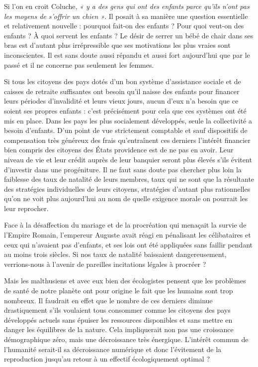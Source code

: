 Si l'on en croit Coluche, \emph{« y a des gens qui ont des enfants parce qu'ils n'ont pas les moyens de s'offrir un chien »}. Il posait à sa manière une question essentielle et relativement nouvelle : pourquoi fait-on des enfants ? Pour quoi veut-on des enfants ? À quoi servent les enfants ?
Le désir de serrer un bébé de chair dans ses bras est d'autant plus irrépressible que ses motivations les plus vraies sont inconscientes. Il est sans doute aussi répandu et aussi fort aujourd'hui que par le passé et il ne concerne pas seulement les femmes. 



 Si tous les citoyens des pays dotés d'un bon système d'assistance sociale et de caisses de retraite suffisantes ont besoin qu'il naisse des enfants pour financer leurs périodes d'invalidité et leurs vieux jours, aucun d'eux n'a besoin que ce soient ses propres enfants : c'est précisément pour cela que ces systèmes ont été mis en place. Dans les pays les plus socialement développés, seule la collectivité a besoin d'enfants. D'un point de vue strictement comptable et sauf dispositifs de compensation très généreux des frais qu'entraînent ces derniers l'intérêt financier bien compris des citoyens des États providence est de ne pas en avoir. Leur niveau de vie et leur crédit auprès de leur banquier seront plus élevés s'ils évitent d'investir dans une progéniture. Il ne faut sans doute pas chercher plus loin la faiblesse des taux de natalité de leurs membres, taux qui ne sont que la résultante des stratégies individuelles de leurs citoyens, stratégies d'autant plus rationnelles qu'on ne voit plus aujourd'hui au nom de quelle exigence morale on pourrait les leur reprocher. 
 
Face à la désaffection du mariage et de la procréation qui menaçait la survie de l'Empire Romain, l'empereur Auguste avait réagi en pénalisant les célibataires et ceux qui n'avaient pas d'enfants, et ses lois ont été appliquées sans faillir pendant au moins trois siècles. Si nos taux de natalité baissaient dangereusement, verrions-nous à l'avenir de pareilles incitations légales  à procréer ? 

 Mais les malthusiens et avec eux bien des écologistes pensent que les problèmes de santé de notre planète ont pour origine le fait que les humains sont trop nombreux. Il faudrait en effet que le nombre de ces derniers diminue drastiquement s'ils voulaient tous consommer comme les citoyens des pays développés actuels sans épuiser les ressources disponibles et sans mettre en danger les équilibres de la nature. Cela impliquerait non pas une croissance démographique zéro, mais une décroissance très énergique. L'intérêt commun de l'humanité serait-il sa décroissance numérique et donc l'évitement de la reproduction jusqu'au retour à un effectif écologiquement optimal ? 
 


